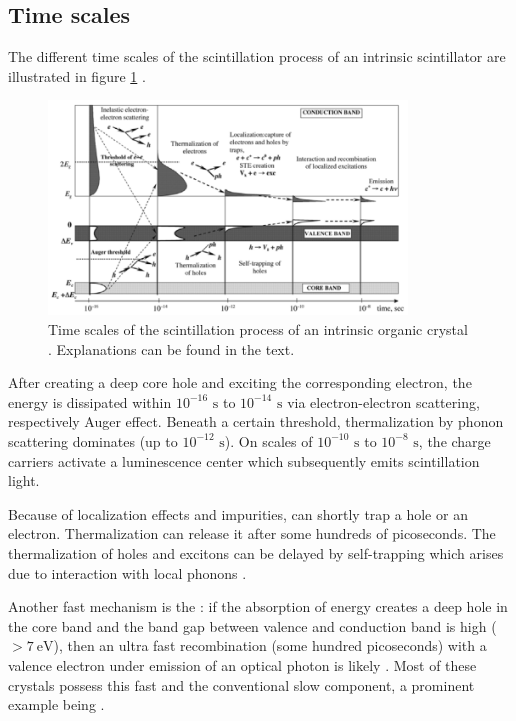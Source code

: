 \subsection{Time scales}
The different time scales of the scintillation process of an intrinsic scintillator are illustrated in figure \ref{fig:ch2:time_scales} \cite{Lecoq}.
\begin{figure}[b!]
	\centering
	\includegraphics[width=0.85\textwidth]{./graphics/ch2/time_scales.png}
	\caption[Time scales of luminescence in inorganic scintillators]{Time scales of the scintillation process of an intrinsic organic crystal \cite{Lecoq}. Explanations can be found in the text.}   
	\label{fig:ch2:time_scales}
\end{figure}
After creating a deep core hole and exciting the corresponding electron, the energy is dissipated within $10^{-16}$ $\si{\second}$ to $10^{-14}$ $\si{\second}$ via electron-electron scattering, respectively Auger effect. Beneath a certain threshold, thermalization by phonon scattering dominates (up to $10^{-12}$ $\si{\second}$). On scales of $10^{-10}$ $\si{\second}$ to $10^{-8}$ $\si{\second}$, the charge carriers activate a luminescence center which subsequently emits scintillation light. \par     
Because of localization effects and impurities,  can shortly trap a hole or an electron. Thermalization can release it after some hundreds of picoseconds. The thermalization of holes and excitons can be delayed by self-trapping which arises due to interaction with local phonons \cite{rodnyi}. \par
Another fast mechanism is the : if the absorption of energy creates a deep hole in the core band and the band gap between valence and conduction band is high ($>\SI{7}{\eV}$), then an ultra fast recombination (some hundred picoseconds) with a valence electron under emission of an optical photon is likely \cite{wermes}. Most of these crystals possess this fast and the conventional slow component, a prominent example being \baf.   
